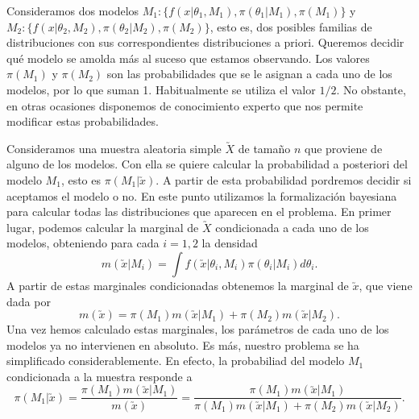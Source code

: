 
Consideramos dos modelos $M_1 : \{f(x | \theta_1, M_1), \pi(\theta_1 | M_1), \pi(M_1) \}$ y $M_2 : \{f(x | \theta_2, M_2), \pi(\theta_2 |M _2), \pi(M_2)\}$, esto es, dos posibles familias de distribuciones con sus correspondientes distribuciones a priori. Queremos decidir qué modelo se amolda más al suceso que estamos observando. Los valores $\pi(M_1)$ y $\pi(M_2)$ son las probabilidades que se le asignan a cada uno de los modelos, por lo que suman 1. Habitualmente se utiliza el valor $1/2$. No obstante, en otras ocasiones disponemos de conocimiento experto que nos permite modificar estas probabilidades.

Consideramos una muestra aleatoria simple $\utilde{X}$ de tamaño $n$ que proviene de alguno de los modelos. Con ella se quiere calcular la probabilidad a posteriori del modelo $M_1$, esto es $\pi(M_1 | \utilde{x})$. A partir de esta probabilidad pordremos decidir si aceptamos el modelo o no. En este punto utilizamos la formalización bayesiana para calcular todas las distribuciones que aparecen en el problema. En primer lugar, podemos calcular la marginal de $\utilde{X}$ condicionada a cada uno de los modelos, obteniendo para cada $i = 1,2$ la densidad
\[m(\utilde{x} | M_i) = \int f(\utilde{x} | \theta_i, M_i) \pi(\theta_i | M_i) d \theta_i.\]
A partir de estas marginales condicionadas obtenemos la marginal de $\utilde{x}$, que viene dada por
\[m(\utilde{x}) = \pi(M_1) m(\utilde{x} | M_1) + \pi(M_2) m(\utilde{x} | M_2).\]
Una vez hemos calculado estas marginales, los parámetros de cada uno de los modelos ya no intervienen en absoluto. Es más, nuestro problema se ha simplificado considerablemente. En efecto, la probabiliad del modelo $M_1$ condicionada a la muestra responde a
\begin{equation} \label{eq:bayes:hipotesis}
\pi(M_1 | \utilde{x}) = \frac{\pi(M_1) m(\utilde{x} | M_1)}{m(\utilde{x})} = \frac{\pi(M_1) m(\utilde{x} | M_1)}{\pi(M_1) m(\utilde{x} | M_1) + \pi(M_2) m(\utilde{x} | M_2)}.
\end{equation}


